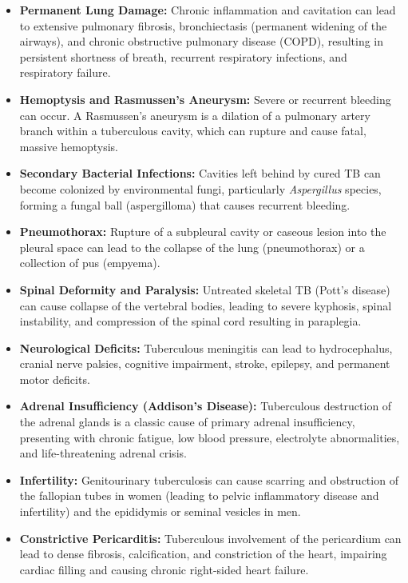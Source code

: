 \begin{itemize}
    \item \textbf{Permanent Lung Damage:} Chronic inflammation and cavitation can lead to extensive pulmonary fibrosis, bronchiectasis (permanent widening of the airways), and chronic obstructive pulmonary disease (COPD), resulting in persistent shortness of breath, recurrent respiratory infections, and respiratory failure.
    \item \textbf{Hemoptysis and Rasmussen's Aneurysm:} Severe or recurrent bleeding can occur. A Rasmussen's aneurysm is a dilation of a pulmonary artery branch within a tuberculous cavity, which can rupture and cause fatal, massive hemoptysis.
    \item \textbf{Secondary Bacterial Infections:} Cavities left behind by cured TB can become colonized by environmental fungi, particularly \textit{Aspergillus} species, forming a fungal ball (aspergilloma) that causes recurrent bleeding.
    \item \textbf{Pneumothorax:} Rupture of a subpleural cavity or caseous lesion into the pleural space can lead to the collapse of the lung (pneumothorax) or a collection of pus (empyema).
    \item \textbf{Spinal Deformity and Paralysis:} Untreated skeletal TB (Pott's disease) can cause collapse of the vertebral bodies, leading to severe kyphosis, spinal instability, and compression of the spinal cord resulting in paraplegia.
    \item \textbf{Neurological Deficits:} Tuberculous meningitis can lead to hydrocephalus, cranial nerve palsies, cognitive impairment, stroke, epilepsy, and permanent motor deficits.
    \item \textbf{Adrenal Insufficiency (Addison's Disease):} Tuberculous destruction of the adrenal glands is a classic cause of primary adrenal insufficiency, presenting with chronic fatigue, low blood pressure, electrolyte abnormalities, and life-threatening adrenal crisis.
    \item \textbf{Infertility:} Genitourinary tuberculosis can cause scarring and obstruction of the fallopian tubes in women (leading to pelvic inflammatory disease and infertility) and the epididymis or seminal vesicles in men.
    \item \textbf{Constrictive Pericarditis:} Tuberculous involvement of the pericardium can lead to dense fibrosis, calcification, and constriction of the heart, impairing cardiac filling and causing chronic right-sided heart failure.
\end{itemize}

